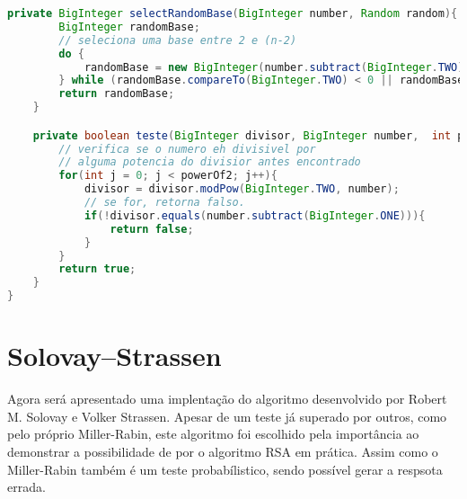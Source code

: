 \documentclass[openany]{ufsctex/ufsctex}
\begin{document}
\begin{lstlisting}[language=Java,breaklines=true, tabsize=2,basicstyle =\fontsize{9}{11}]
    private BigInteger selectRandomBase(BigInteger number, Random random){
        BigInteger randomBase;
        // seleciona uma base entre 2 e (n-2)
        do {
            randomBase = new BigInteger(number.subtract(BigInteger.TWO).bitLength(), random);
        } while (randomBase.compareTo(BigInteger.TWO) < 0 || randomBase.compareTo(number.subtract(BigInteger.TWO)) > 0);
        return randomBase;
    }

    private boolean teste(BigInteger divisor, BigInteger number,  int powerOf2){
        // verifica se o numero eh divisivel por
        // alguma potencia do divisior antes encontrado
        for(int j = 0; j < powerOf2; j++){
            divisor = divisor.modPow(BigInteger.TWO, number);
            // se for, retorna falso.
            if(!divisor.equals(number.subtract(BigInteger.ONE))){
                return false;
            }
        }
        return true;
    }
}

	 \end{lstlisting}
	
\section{Solovay–Strassen} 
	 Agora será apresentado uma implentação do algoritmo desenvolvido por  Robert M. Solovay e Volker Strassen. Apesar de um teste já superado por outros, como pelo próprio Miller-Rabin, este algoritmo foi escolhido pela importância ao demonstrar a possibilidade de por o algoritmo RSA em prática. Assim como o Miller-Rabin também é um teste probabílistico, sendo possível gerar a respsota errada. 
	 
\end{document}
